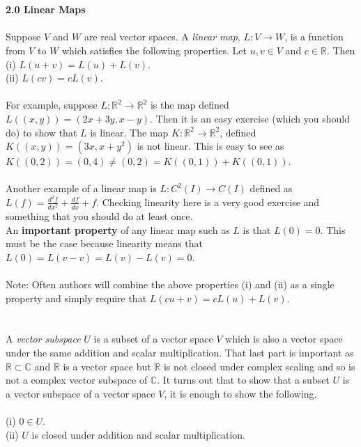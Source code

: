 \documentclass{amsart}
\begin{document}
\\\\
{\bf 2.0 Linear Maps}\\\\
Suppose $V$ and $W$ are real vector spaces. A {\it linear map}, $L:V\rightarrow W$, is a function from $V$ to $W$ which satisfies the following properties. Let $u,v\in V$ and $c\in \mathbb{R}$. Then\\
(i) $L(u+v)=L(u)+L(v)$.\\
(ii) $L(cv)=cL(v)$.\\
\\
For example, suppose $L:\mathbb{R}^{2}\rightarrow \mathbb{R}^{2}$ is the map defined $L((x,y))=(2x+3y,x-y)$. Then it is an easy exercise (which you should do) to show that $L$ is linear. The map $K:\mathbb{R}^{2}\rightarrow \mathbb{R}^{2}$, defined $K((x,y))=(3x,x+y^{2})$ is not linear. This is easy to see as $K((0,2))=(0,4)\neq (0,2)=K((0,1))+K((0,1))$.\\
\\
Another example of a linear map is $L:C^{2}(I)\rightarrow C(I)$ defined as $L(f)=\frac{d^{2}f}{dx^{2}}+\frac{df}{dx}+f$. Checking linearity here is a very good exercise and something that you should do at least once.\\
An {\bf important property} of any linear map such as $L$ is that $L(0)=0$. This must be the case because linearity means that $L(0)=L(v-v)=L(v)-L(v)=0$.
\\\\
Note: Often authors will combine the above properties (i) and (ii) as a single property and simply require that $L(cu+v)=cL(u)+L(v)$.\\
\newpage
{}\\\\
A {\it vector subspace} $U$ is a subset of a vector space $V$ which is also a vector space under the same addition and scalar multiplication. That last part is important as $\mathbb{R}\subset \mathbb{C}$ and $\mathbb{R}$ is a vector space but $\mathbb{R}$ is not closed under complex scaling and so is not a complex vector subspace of $\mathbb{C}$. It turns out that to show that a subset $U$ is a vector subspace of a vector space $V$, it is enough to show the following.\\
\\
(i) $0\in U$.\\
(ii) $U$ is closed under addition and scalar multiplication.\\
\\
\end{document}

